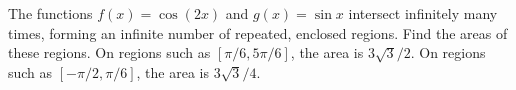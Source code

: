 {The functions $f(x) = \cos (2x)$ and $g(x) = \sin x$ intersect infinitely many times, forming an infinite number of repeated, enclosed regions. Find the areas of these regions.}
{On regions such as $[\pi/6,5\pi/6]$, the area is $3\sqrt{3}/2$. On regions such as $[-\pi/2,\pi/6]$, the area is $3\sqrt{3}/4$. }
